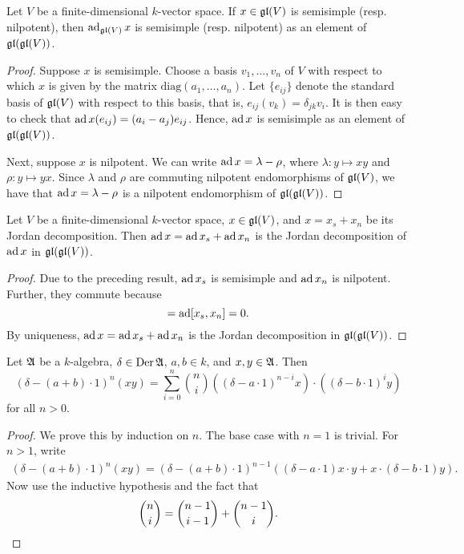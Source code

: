 \begin{proposition}
    Let $V$ be a finite-dimensional $k$-vector space. If $x\in\mathfrak{gl}(V)$ is semisimple (resp. nilpotent), then $\operatorname{ad}_{\mathfrak{gl}(V)} x$ is semisimple (resp. nilpotent) as an element of $\mathfrak{gl}(\mathfrak{gl}(V))$.
\end{proposition}
\begin{proof}
    Suppose $x$ is semisimple. Choose a basis $v_1,\dots,v_n$ of $V$ with respect to which $x$ is given by the matrix $\mathrm{diag}(a_1,\dots,a_n)$. Let $\{e_{ij}\}$ denote the standard basis of $\mathfrak{gl}(V)$ with respect to this basis, that is, $e_{ij}(v_k) = \delta_{jk}v_i$. It is then easy to check that $\operatorname{ad} x(e_{ij}) = (a_i - a_j)e_{ij}$. Hence, $\operatorname{ad} x$ is semisimple as an element of $\mathfrak{gl}(\mathfrak{gl}(V))$.

    Next, suppose $x$ is nilpotent. We can write $\operatorname{ad} x = \lambda - \rho$, where $\lambda: y\mapsto xy$ and $\rho: y\mapsto yx$. Since $\lambda$ and $\rho$ are commuting nilpotent endomorphisms of $\mathfrak{gl}(V)$, we have that $\operatorname{ad} x = \lambda - \rho$ is a nilpotent endomorphism of $\mathfrak{gl}(\mathfrak{gl}(V))$.
\end{proof}

\begin{corollary}
    Let $V$ be a finite-dimensional $k$-vector space, $x\in\mathfrak{gl}(V)$, and $x = x_s + x_n$ be its Jordan decomposition. Then $\operatorname{ad} x = \operatorname{ad} x_s + \operatorname{ad} x_n$ is the Jordan decomposition of $\operatorname{ad} x$ in $\mathfrak{gl}(\mathfrak{gl}(V))$.
\end{corollary}
\begin{proof}
    Due to the preceding result, $\operatorname{ad} x_s$ is semisimple and $\operatorname{ad} x_n$ is nilpotent. Further, they commute because 
    \begin{equation*}
        [\ad x_s, \ad x_n] = \ad[x_s, x_n] = 0.
    \end{equation*}
    By uniqueness, $\operatorname{ad} x = \operatorname{ad} x_s + \operatorname{ad} x_n$ is the Jordan decomposition in $\mathfrak{gl}(\mathfrak{gl}(V))$.
\end{proof}

\begin{lemma}
    Let $\mathfrak{A}$ be a $k$-algebra, $\delta\in\operatorname{Der}\mathfrak{A}$, $a,b\in k$, and $x,y\in\mathfrak{A}$. Then 
    \begin{equation*}
        \left(\delta - (a + b)\cdot 1\right)^n(x y) = \sum_{i = 0}^n \binom{n}{i}\left((\delta - a\cdot 1)^{n - i} x\right)\cdot\left((\delta - b\cdot 1)^{i}y\right)
    \end{equation*}
    for all $n > 0$.
\end{lemma}
\begin{proof}
    We prove this by induction on $n$. The base case with $n = 1$ is trivial. For $n > 1$, write 
    \begin{align*}
        (\delta - (a + b)\cdot 1)^n (xy) = (\delta - (a + b)\cdot 1)^{n - 1}\left((\delta - a\cdot 1) x\cdot y + x\cdot (\delta - b\cdot 1)y\right).
    \end{align*}
    Now use the inductive hypothesis and the fact that 
    \begin{equation*}
        \binom{n}{i} = \binom{n - 1}{i - 1} + \binom{n - 1}{i}.\qedhere
    \end{equation*}
\end{proof}

